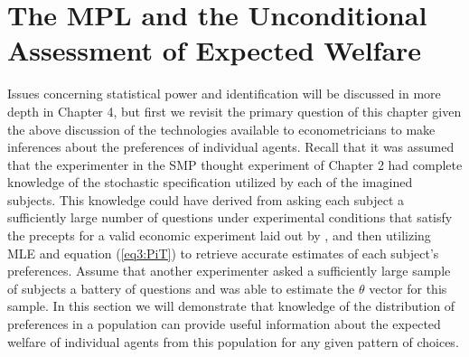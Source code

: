 \documentclass[../main.tex]{subfiles}
\begin{document}
\section{The \texorpdfstring{\textcite{Holt2002}}{Holt and Laury (2002)} MPL and the Unconditional Assessment of Expected Welfare}

Issues concerning statistical power and identification will be discussed in more depth in Chapter 4, but first we revisit the primary question of this chapter given the above discussion of the technologies available to econometricians to make inferences about the preferences of individual agents.
Recall that it was assumed that the experimenter in the SMP thought experiment of Chapter 2 had complete knowledge of the stochastic specification utilized by each of the imagined subjects.
This knowledge could have derived from asking each subject a sufficiently large number of questions under experimental conditions that satisfy the precepts for a valid economic experiment laid out by \textcite{Smith1982}{\footnotemark}, and then utilizing MLE and equation (\ref{eq3:PiT}) to retrieve accurate estimates of each subject's preferences.
Assume that another experimenter asked a sufficiently large sample of subjects a battery of questions and was able to estimate the $\theta$ vector for this sample.
In this section we will demonstrate that knowledge of the distribution of preferences in a population can provide useful information about the expected welfare of individual agents from this population for any given pattern of choices.

\addtocounter{footnote}{-1}
\end{document}
